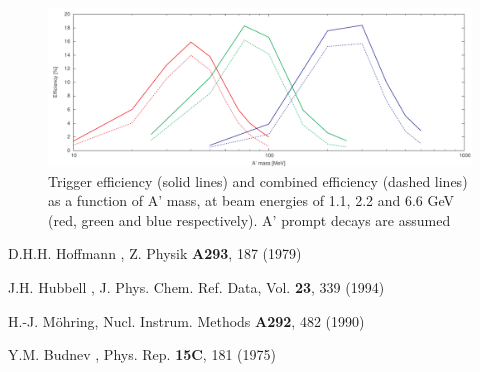 \begin{figure}[ht]
	\includegraphics[width=\textwidth]{performance/ap_eff}
	\caption{\small{Trigger efficiency (solid lines) and combined efficiency (dashed lines) as a function of A' mass, at beam energies of 1.1, 2.2 and 6.6 GeV (red, green and blue respectively). A' prompt decays are assumed}}
	\label{fig:trigeff}
\end{figure}



\begin{thebibliography}{99}
D.H.H. Hoffmann \etal, Z. Physik {\bf A293}, 187 (1979)

J.H. Hubbell \etal, J. Phys. Chem. Ref. Data, Vol. {\bf 23}, 339 (1994) 

 H.-J. M\"{o}hring, Nucl. Instrum. Methods {\bf A292}, 482 (1990)

 Y.M. Budnev \etal, Phys. Rep. {\bf 15C}, 181 (1975)

\end{thebibliography}


